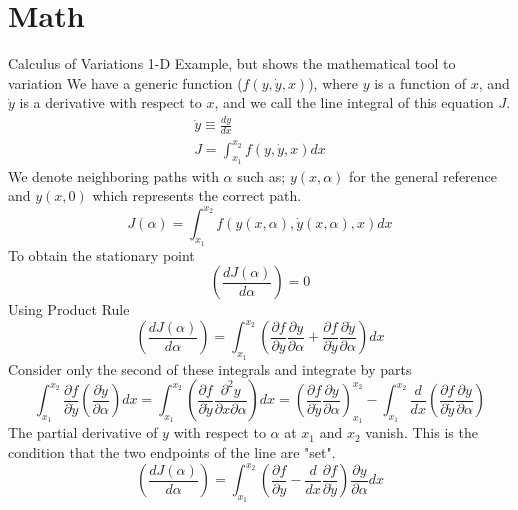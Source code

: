\documentclass[12pt]{article}
\begin{document}
\section{Math}
    Calculus of Variations
    1-D Example, but shows the mathematical tool to variation
    We have a generic function ($f(y, \dot{y}, x)$), where $y$ is a function of $x$, and $\dot{y}$ is a derivative with respect to $x$, and we call the line integral of this equation $J$.
    \begin{gather*}
        \dot{y} \equiv \frac{dy}{dx}
        \\ J = \int_{x_1}^{x_2} f(y,\dot{y}, x) dx
    \end{gather*}
    We denote neighboring paths with $\alpha$ such as; $y(x,\alpha)$ for the general reference and $y(x,0)$ which represents the correct path. %
    \begin{equation}
        J(\alpha) = \int_{x_1}^{x_2} f(y(x,\alpha), \dot{y}(x,\alpha), x) dx
    \end{equation}
    To obtain the stationary point
    \begin{equation}    
        \left(\frac{dJ(\alpha)}{d \alpha} \right) = 0
    \end{equation}
    Using Product Rule
    \begin{equation}
        \left(\frac{dJ(\alpha)}{d \alpha} \right) = \int_{x_1}^{x_2} \left(\frac{\partial f}{\partial y} \frac{\partial y}{\partial \alpha} + \frac{\partial f}{\partial \dot{y}} \frac{\partial \dot{y}}{\partial \alpha} \right) dx
    \end{equation}
    Consider only the second of these integrals and integrate by parts
    \begin{equation}
        \int_{x_1}^{x_2} \frac{\partial f}{\partial \dot{y}} \left( \frac{\partial \dot{y}}{\partial \alpha} \right) dx = \int_{x_1}^{x_2} \left( \frac{\partial f}{\partial \dot{y}} \frac{\partial^2 y}{\partial x \partial \alpha} \right) dx = \left( \frac{\partial f}{\partial \dot{y}} \frac{\partial y}{\partial \alpha} \right)_{x_1}^{x_2} - \int_{x_1}^{x_2} \frac{d}{dx} \left(\frac{\partial f}{\partial \dot{y}} \frac{\partial y}{\partial \alpha} \right)
    \end{equation}
    The partial derivative of $y$ with respect to $\alpha$ at $x_1$ and $x_2$ vanish. This is the condition that the two endpoints of the line are "set". 
    \begin{equation}
        \left(\frac{dJ(\alpha)}{d \alpha} \right) = \int_{x_1}^{x_2} \left(\frac{\partial f}{\partial y} - \frac{d}{dx} \frac{\partial f}{\partial \dot{y}} \right) \frac{\partial y}{\partial \alpha} dx
    \end{equation}
\end{document}
